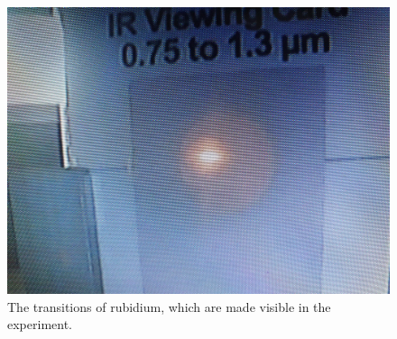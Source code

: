 \begin{figure}[H]
  \centering
  \includegraphics[width=.8\textwidth]{content/led_card.jpeg}
  \caption{The transitions of rubidium, which are made visible in the experiment. \cite{Anleitung}}
  \label{fig:rubiAbs}
\end{figure}